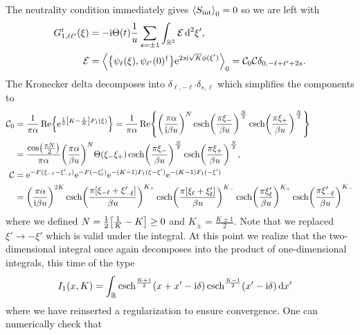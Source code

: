 \documentclass[english, parskip=full]{scrartcl}
\begin{document}
The neutrality condition immediately gives $\bra*{S_\Text{int}}_0 = 0$ so we are left with
\begin{align}
G_{1,\ell\ell'}^\r(\xi) &= -\i\Theta(t) \frac{1}{u} \sum_{s=\pm 1} \intrnd{2}{ \mathcal{E} }{\xi'},\\
\mathcal{E} &= \bra*{\klc*{\psi_\ell(\xi), \psi_{\ell'}(0)^\dagger} \powe{2s\i\sqrt{K} \phi(\xi')}}_0 = \mathcal{C}_0 \mathcal{C} \delta_{0, -\ell + \ell' + 2s}.
\end{align}
The Kronecker delta decomposes into $\delta_{\ell,-\ell'} \delta_{s,\ell}$ which simplifies the components to
\begin{align}
\mathcal{C}_0 &= \frac{1}{\pi\alpha} \Re\klc*{\powe{\frac{1}{2} \klb*{K - \frac{1}{K}} F_1(\xi)}} = \frac{1}{\pi\alpha} \Re \klc*{ \kla*{\frac{\pi\alpha}{\i\beta u}}^N \csch\kla*{\frac{\pi\xi_-}{\beta u}}^\frac{N}{2} \csch\kla*{\frac{\pi\xi_+}{\beta u}}^\frac{N}{2} }\\
&= \frac{\cos\kla*{\frac{\pi N}{2}}}{\pi\alpha} \kla*{\frac{\pi\alpha}{\beta u}}^N \Theta(\xi_- \xi_+) \csch\kla*{\frac{\pi\xi_-}{\beta u}}^\frac{N}{2} \csch\kla*{\frac{\pi\xi_+}{\beta u}}^\frac{N}{2},\\
\mathcal{C} &= \powe{-F(\xi_{-\ell} - \xi'_{-\ell})} \powe{-F(-\xi'_{\ell})} \powe{-(K-1) F_1(\xi - \xi')} \powe{-(K-1) F_1(-\xi')}\\
&= \kla*{\frac{\pi\alpha}{\i\beta u}}^{2K} \csch\kla*{\frac{\pi [\xi_{-\ell} + \xi_{-\ell}']}{\beta u}}^{K_+} \csch\kla*{\frac{\pi [\xi_{\ell} + \xi_{\ell}']}{\beta u}}^{K_-} \csch\kla*{\frac{\pi \xi_{\ell}'}{\beta u}}^{K_+} \csch\kla*{\frac{\pi \xi_{-\ell}'}{\beta u}}^{K_-} 
\end{align}
where we defined $N=\frac{1}{2} \klb*{\frac{1}{K} - K}\ge 0$ and $K_\pm = \frac{K \pm 1}{2}$.
Note that we replaced $\xi'\rightarrow -\xi'$ which is valid under the integral.
At this point we realize that the two-dimensional integral once again decomposes into the product of one-dimensional integrals, this time of the type
\begin{align}
I_1(x,K) &= \intr{\csch^\frac{K+1}{2}\kla*{x+x' - \i\delta} \csch^\frac{K-1}{2}\kla*{x' - \i\delta}}{x'}
\end{align}
where we have reinserted a regularization to ensure convergence.
One can numerically check that
\end{document}
